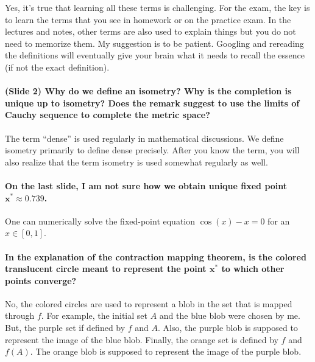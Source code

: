 \documentclass[10pt,english]{article}
\begin{document}
Yes, it's true that learning all these terms is challenging.
For the exam, the key is to learn the terms that you see in homework or on the practice exam.
In the lectures and notes, other terms are also used to explain things but you do not need to memorize them.
My suggestion is to be patient.
Googling and rereading the definitions will eventually give your brain what it needs to recall the essence (if not the exact definition).




\paragraph{(Slide 2) Why do we define an isometry?  Why is the completion is unique up to isometry? Does the remark suggest to use the limits of Cauchy sequence to complete the metric space? }

The term ``dense'' is used regularly in mathematical discussions.
We define isometry primarily to define dense precisely.
After you know the term, you will also realize that the term isometry is used somewhat regularly as well.


\paragraph{On the last slide, I am not sure how we obtain unique fixed point $\boldsymbol{x^* \approx 0.739}$.}

One can numerically solve the fixed-point equation $\cos(x)-x=0$ for an $x\in[0,1]$.

\paragraph{In the explanation of the contraction mapping theorem, is the colored translucent circle meant to represent the point $\boldsymbol{x^*}$ to which other points converge?}

No, the colored circles are used to represent a blob in the set that is mapped through $f$.
For example, the initial set $A$ and the blue blob were chosen by me.
But, the purple set if defined by $f$ and $A$.
Also, the purple blob is supposed to represent the image of the blue blob.
Finally, the orange set is defined by $f$ and $f(A)$.
The orange blob is supposed to represent the image of the purple blob.
\end{document}
